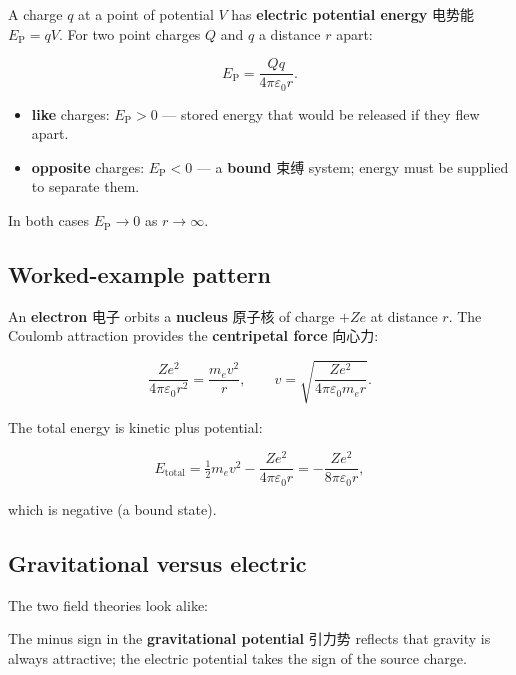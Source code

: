 \documentclass[11pt]{article}
\begin{document}
A charge $q$ at a point of potential $V$ has \textbf{electric potential energy} 电势能 $E_{\text{P}} = qV$. For two point charges $Q$ and $q$ a distance $r$ apart:

\[
E_{\text{P}} = \frac{Qq}{4\pi\varepsilon_{0} r}.
\]

\begin{itemize}
\item \textbf{like} charges: $E_{\text{P}} > 0$ — stored energy that would be released if they flew apart.

\item \textbf{opposite} charges: $E_{\text{P}} < 0$ — a \textbf{bound} 束缚 system; energy must be supplied to separate them.

\end{itemize}

In both cases $E_{\text{P}} \to 0$ as $r \to \infty$.

\subsection*{Worked-example pattern}

An \textbf{electron} 电子 orbits a \textbf{nucleus} 原子核 of charge $+Ze$ at distance $r$. The Coulomb attraction provides the \textbf{centripetal force} 向心力:

\[
\frac{Z e^{2}}{4\pi\varepsilon_{0} r^{2}} = \frac{m_{e} v^{2}}{r}, \qquad v = \sqrt{\frac{Z e^{2}}{4\pi\varepsilon_{0} m_{e} r}}.
\]

The total energy is kinetic plus potential:

\[
E_{\text{total}} = \tfrac{1}{2} m_{e} v^{2} - \frac{Z e^{2}}{4\pi\varepsilon_{0} r} = -\frac{Z e^{2}}{8\pi\varepsilon_{0} r},
\]

which is negative (a bound state).

\subsection*{Gravitational versus electric}

The two field theories look alike:

\begin{center}
\end{center}

The minus sign in the \textbf{gravitational potential} 引力势 reflects that gravity is always attractive; the electric potential takes the sign of the source charge.
\end{document}

